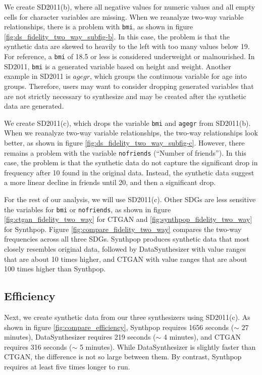 \documentclass[runningheads]{llncs}
\begin{document}
We create SD2011(b), where all negative values for numeric values and all empty cells for character variables are missing.  When we reanalyze two-way variable relationships, there is a problem with \texttt{bmi}, as shown in figure \ref{fig:ds_fidelity_two_way_subfig-b}.  In this case, the problem is that the synthetic data are skewed to heavily to the left with too many values below 19.  For reference, a \texttt{bmi} of 18.5 or less is considered underweight or malnourished.  In SD2011, \texttt{bmi} is a generated variable based on height and weight.  Another example in SD2011 is $agegr$, which groups the continuous variable for age into groups.  Therefore, users may want to consider dropping generated variables that are not strictly necessary to synthesize and may be created after the synthetic data are generated.  

We create SD2011(c), which drops the variable \texttt{bmi} and \texttt{agegr}  from SD2011(b).  When we reanalyze two-way variable relationships, the two-way relationships look better, as shown in figure \ref{fig:ds_fidelity_two_way_subfig-c}.  However, there remains a problem with the variable \texttt{nofriends} (``Number of friends'').  In this case, the problem is that the synthetic data do not capture the significant drop in frequency after 10 found in the original data.  Instead, the synthetic data suggest a more linear decline in friends until 20, and then a significant drop.  

For the rest of our analysis, we will use SD2011(c).  Other SDGs are less sensitive the variables for \texttt{bmi} or \texttt{nofriends}, as shown in figure \ref{fig:ctgan_fidelity_two_way} for CTGAN and \ref{fig:synthpop_fidelity_two_way} for Synthpop.  Figure \ref{fig:compare_fidelity_two_way} compares the two-way frequencies across all three SDGs.  Synthpop produces synthetic data that most closely resembles original data, followed by DataSynthesizer with value ranges that are about 10 times higher, and CTGAN with value ranges that are about 100 times higher than Synthpop.

\subsection{Efficiency}

Next, we create synthetic data from our three synthesizers using SD2011(c).  As shown in figure \ref{fig:compare_efficiency}, Synthpop requires 1656 seconds ($\sim$ 27 minutes), DataSynthesizer requires 219 seconds ($\sim$ 4 minutes), and CTGAN requires 316 seconds ($\sim$ 5 minutes).  While DataSynthesizer is slightly faster than CTGAN, the difference is not so large between them.  By contrast, Synthpop requires at least five times longer to run. 
\end{document}
